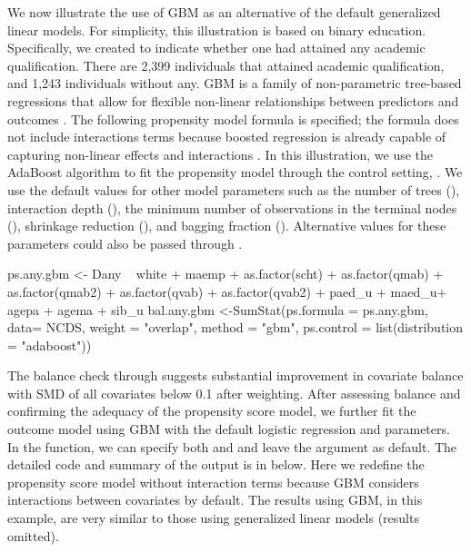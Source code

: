We now illustrate the use of GBM as an alternative of the default generalized linear models. For simplicity, this illustration is based on binary education. Specifically, we created  to indicate whether one had attained any academic qualification. There are 2,399 individuals that attained academic qualification, and 1,243 individuals without any. GBM is a family of non-parametric tree-based regressions that allow for flexible non-linear relationships between predictors and outcomes \citep{Friedman2000}. The following propensity model formula is specified; the formula does not include interactions terms because boosted regression is already capable of capturing non-linear effects and interactions \citep{McCaffrey2004}. In this illustration, we use the AdaBoost \citep{freund1997decision} algorithm to fit the propensity model through the control setting, . We use the default values for other model parameters such as the number of trees (), interaction depth (), the minimum number of observations in the terminal nodes (), shrinkage reduction (), and bagging fraction (). Alternative values for these parameters could also be passed through .  

\begin{example}
ps.any.gbm <- Dany ~ white + maemp + as.factor(scht) + as.factor(qmab) + 
    as.factor(qmab2) + as.factor(qvab) + as.factor(qvab2) + paed_u +  maed_u+ 
    agepa + agema + sib_u
bal.any.gbm <-SumStat(ps.formula = ps.any.gbm, data= NCDS,  weight = "overlap",
    method = "gbm", ps.control = list(distribution = "adaboost"))
\end{example}

The balance check through  suggests substantial improvement in covariate balance with SMD of all covariates below 0.1 after weighting. After assessing balance and confirming the adequacy of the propensity score model, we further fit the outcome model using GBM with the default logistic regression and parameters. In the  function, we can specify both  and  and leave the  argument as default. The detailed code and summary of the output is in below. Here we redefine the propensity score model without interaction terms because GBM considers interactions between covariates by default. The results using GBM, in this example, are very similar to those using generalized linear models (results omitted).

